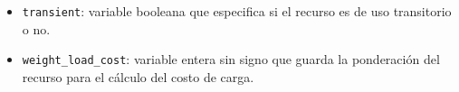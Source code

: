 \documentclass[../informe2.tex]{subfiles}
\begin{document}
\noindent\begin{minipage}{0.5\textwidth}
	\small
	\begin{itemize}[leftmargin=*]
		\item \texttt{transient}: variable booleana que especifica si el recurso es de uso transitorio o no.
		\item \texttt{weight\_load\_cost}: variable entera sin signo que guarda la ponderación del  recurso para el cálculo del costo de carga.
	\end{itemize}
\end{minipage}
\hfill
\begin{minipage}{0.4\textwidth}
\end{minipage}

\bigskip
\end{document}
